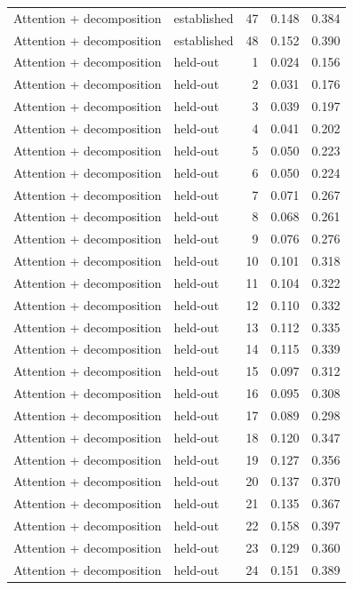 \begin{tabular}{llrrr}
Attention + decomposition & established & 47 & 0.148 & 0.384 \\
Attention + decomposition & established & 48 & 0.152 & 0.390 \\
Attention + decomposition & held-out & 1 & 0.024 & 0.156 \\
Attention + decomposition & held-out & 2 & 0.031 & 0.176 \\
Attention + decomposition & held-out & 3 & 0.039 & 0.197 \\
Attention + decomposition & held-out & 4 & 0.041 & 0.202 \\
Attention + decomposition & held-out & 5 & 0.050 & 0.223 \\
Attention + decomposition & held-out & 6 & 0.050 & 0.224 \\
Attention + decomposition & held-out & 7 & 0.071 & 0.267 \\
Attention + decomposition & held-out & 8 & 0.068 & 0.261 \\
Attention + decomposition & held-out & 9 & 0.076 & 0.276 \\
Attention + decomposition & held-out & 10 & 0.101 & 0.318 \\
Attention + decomposition & held-out & 11 & 0.104 & 0.322 \\
Attention + decomposition & held-out & 12 & 0.110 & 0.332 \\
Attention + decomposition & held-out & 13 & 0.112 & 0.335 \\
Attention + decomposition & held-out & 14 & 0.115 & 0.339 \\
Attention + decomposition & held-out & 15 & 0.097 & 0.312 \\
Attention + decomposition & held-out & 16 & 0.095 & 0.308 \\
Attention + decomposition & held-out & 17 & 0.089 & 0.298 \\
Attention + decomposition & held-out & 18 & 0.120 & 0.347 \\
Attention + decomposition & held-out & 19 & 0.127 & 0.356 \\
Attention + decomposition & held-out & 20 & 0.137 & 0.370 \\
Attention + decomposition & held-out & 21 & 0.135 & 0.367 \\
Attention + decomposition & held-out & 22 & 0.158 & 0.397 \\
Attention + decomposition & held-out & 23 & 0.129 & 0.360 \\
Attention + decomposition & held-out & 24 & 0.151 & 0.389 \\

\end{tabular}
